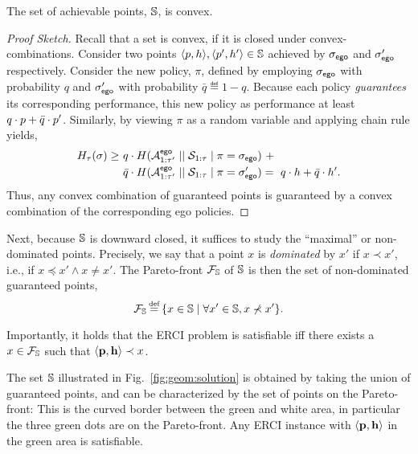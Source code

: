 \begin{proposition}
  The set of achievable points, $\mathbb{S}$, is convex. 
\end{proposition}
\begin{proof}[Proof Sketch]
  Recall that a set is convex, if it is closed under
  convex-combinations\footnotemark. Consider two points
  $\langle p, h \rangle, \langle p', h' \rangle \in
  \mathbb{S}$ achieved by ${\sigma_{\mathsf{ego}}}$ and ${\sigma'_{\mathsf{ego}}}$
  respectively. Consider the new policy, $\pi$, defined by employing
  ${\sigma_{\mathsf{ego}}}$ with probability $q$ and ${\sigma'_{\mathsf{ego}}}$ with
  probability $\bar{q} \eqdef 1 - q$.  Because each policy
  \emph{guarantees} its corresponding performance, this new policy as
  performance at least $q\cdot p + \bar{q}\cdot p'$.  Similarly,
  by viewing $\pi$ as a random variable and applying chain rule
  yields,
  \begin{equation}
    \begin{split}
      H_\tau(\sigma)
      \geq &~q \cdot H( {\mathcal{A}}^{\mathsf{ego}}_{1:\tau'} \mid\mid {\mathcal{S}}_{1:\tau} \mid \pi={\sigma_{\mathsf{ego}}})~+\\
      &~\bar{q}  \cdot H( {\mathcal{A}}^{\mathsf{ego}}_{1:\tau'} \mid\mid {\mathcal{S}}_{1:\tau} \mid \pi={\sigma'_{\mathsf{ego}}})
      =~q\cdot h + \bar{q}\cdot h'.
    \end{split}
  \end{equation}
  Thus, any convex combination of guaranteed points is guaranteed by
  a convex combination of the corresponding ego policies.
\end{proof}

Next, because $\mathbb{S}$ is downward closed, it
suffices to study the ``maximal'' or non-dominated points.  Precisely,
we say that a point $x$ is \emph{dominated} by $x'$ if $x \prec
x'$, i.e., if $x \preceq x' \wedge x \neq x'$.
The Pareto-front $\mathcal{F}_{\mathbb{S}}$ of $\mathbb{S}$ is then the set of non-dominated guaranteed points,
\begin{equation}
  \pareto{\solutions} \eqdef \{ x \in \solutions \mid \forall x' \in \solutions, x \not\prec x'  \}.  
\end{equation}
\noindent
\begin{mdframed}
Importantly, it holds that the ERCI problem is satisfiable iff there exists a  $x \in \mathcal{F}_{\mathbb{S}}$ such that $\langle \mathbf{p}, \mathbf{h} \rangle \prec x$.    
\end{mdframed}
\begin{example}
	The set $\mathbb{S}$ illustrated in Fig.~\ref{fig:geom:solution} is obtained by taking the union of guaranteed points, and can be characterized by the set of points on the Pareto-front: This is the curved border between the green and white area, in particular the three green dots are on the Pareto-front. Any ERCI instance with $\langle \mathbf{p}, \mathbf{h} \rangle$ in the green area is satisfiable.
\end{example}


